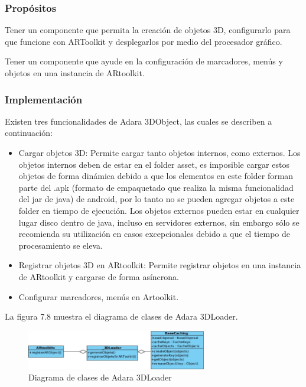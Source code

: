 \documentclass[12pt,a4paper,spanish,openany]{book}
\begin{document}
\subsubsection{Propósitos}
Tener un componente que permita la creación de objetos 3D, configurarlo para que
funcione con ARToolkit y desplegarlos por medio del procesador gráfico.

Tener un componente que ayude en la configuración de marcadores, menús y objetos
en una instancia de ARtoolkit.

\subsubsection{Implementación}

Existen tres funcionalidades de Adara 3DObject, las cuales se describen a
continuación:

\begin{itemize}
  \item Cargar objetos 3D:  Permite cargar tanto objetos internos, como
  externos. Los objetos internos deben de estar en el folder asset, es imposible
  cargar estos objetos de forma dinámica debido a que los elementos en este
  folder forman parte del .apk (formato de empaquetado que realiza la misma
  funcionalidad del jar de java) de android, por lo tanto no se pueden agregar
  objetos a este folder en tiempo de ejecución. Los objetos externos pueden
  estar en cualquier lugar disco dentro de java, incluso en servidores externos,
  sin embargo sólo se recomienda su utilización en casos excepcionales debido a
  que el tiempo de procesamiento se eleva.
  
  \item Registrar objetos 3D en ARtoolkit: Permite registrar objetos en una
  instancia de ARtoolkit y cargarse de forma asíncrona.
  
  \item Configurar marcadores, menús en Artoolkit.
\end{itemize}



La figura 7.8 muestra el diagrama de clases de Adara 3DLoader.
\begin{figure}[ht]
\begin{center}
 \includegraphics[width=0.7\textwidth]{./img/clasesLoader.jpg}
\caption{Diagrama de clases de Adara 3DLoader}
\end{center}
\end{figure}
\end{document}
